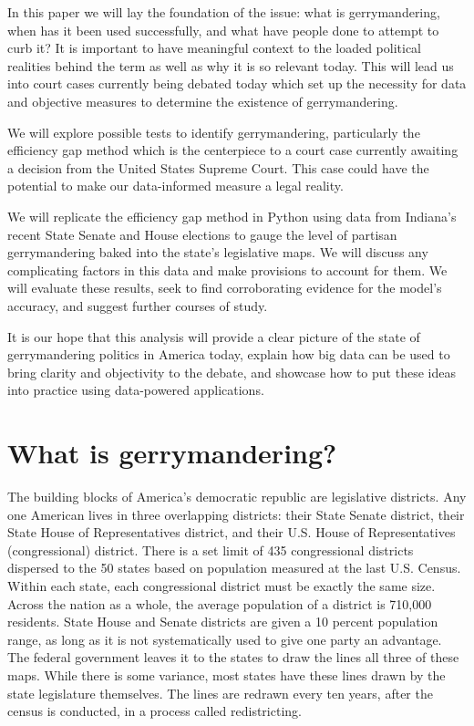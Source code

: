\documentclass[sigconf]{acmart}
\begin{document}
In this paper we will lay the foundation of the issue: what is gerrymandering, when has it been used successfully, and what have people done to attempt to curb it? It is important to have meaningful context to the loaded political realities behind the term as well as why it is so relevant today. This will lead us into court cases currently being debated today which set up the necessity for data and objective measures to determine the existence of gerrymandering. 

We will explore possible tests to identify gerrymandering, particularly the efficiency gap method which is the centerpiece to a court case currently awaiting a decision from the United States Supreme Court. This case could have the potential to make our data-informed measure a legal reality.

We will replicate the efficiency gap method in Python using data from Indiana's recent State Senate and House elections to gauge the level of partisan gerrymandering baked into the state's legislative maps. We will discuss any complicating factors in this data and make provisions to account for them. We will evaluate these results, seek to find corroborating evidence for the model's accuracy, and suggest further courses of study.

It is our hope that this analysis will provide a clear picture of the state of gerrymandering politics in America today, explain how big data can be used to bring clarity and objectivity to the debate, and showcase how to put these ideas into practice using data-powered applications.

\section{What is gerrymandering?}
The building blocks of America's democratic republic are legislative districts. Any one American lives in three overlapping districts: their State Senate district, their State House of Representatives district, and their U.S. House of Representatives (congressional) district. There is a set limit of 435 congressional districts dispersed to the 50 states based on population measured at the last U.S. Census. Within each state, each congressional district must be exactly the same size. Across the nation as a whole, the average population of a district is 710,000 residents. State House and Senate districts are given a 10 percent population range, as long as it is not systematically used to give one party an advantage. The federal government leaves it to the states to draw the lines all three of these maps. While there is some variance, most states have these lines drawn by the state legislature themselves. The lines are redrawn every ten years, after the census is conducted, in a process called redistricting.\cite{maps}\cite{population}\cite{govtrack}
\end{document}
